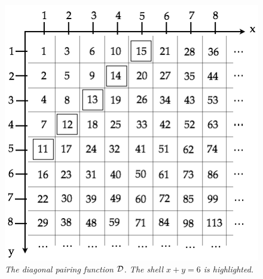 \begin{figure}[htb]
\begin{center}
      \includegraphics[scale=0.4]{FiguresArithmetic/PairingDiagonal}
\end{center}
\caption{{\it The diagonal pairing function $\mbox{$\cal D$}$.  The shell $x+y = 6$
    is highlighted.}
\label{fig:diag}}
\end{figure}
